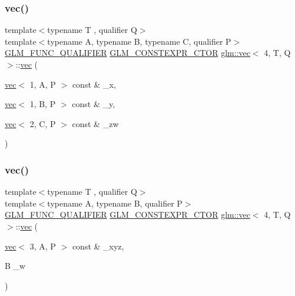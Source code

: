 \mbox{\label{structglm_1_1vec_3_014_00_01_t_00_01_q_01_4_ab16d5c7c6e22f08e197088a9535a114b}} 
\subsubsection{\texorpdfstring{vec()}{vec()}\hspace{0.1cm}{\footnotesize\ttfamily [28/34]}}
{\footnotesize\ttfamily template$<$typename T , qualifier Q$>$ \\
template$<$typename A, typename B, typename C, qualifier P$>$ \\
\mbox{\hyperlink{setup_8hpp_a33fdea6f91c5f834105f7415e2a64407}{G\+L\+M\+\_\+\+F\+U\+N\+C\+\_\+\+Q\+U\+A\+L\+I\+F\+I\+ER}} \mbox{\hyperlink{setup_8hpp_ad34178a09666081abdb573c14d1f4a5a}{G\+L\+M\+\_\+\+C\+O\+N\+S\+T\+E\+X\+P\+R\+\_\+\+C\+T\+OR}} \mbox{\hyperlink{structglm_1_1vec}{glm\+::vec}}$<$ 4, T, Q $>$\+::\mbox{\hyperlink{structglm_1_1vec}{vec}} (\begin{DoxyParamCaption}\item[{\mbox{\hyperlink{structglm_1_1vec}{vec}}$<$ 1, A, P $>$ const \&}]{\+\_\+x,  }\item[{\mbox{\hyperlink{structglm_1_1vec}{vec}}$<$ 1, B, P $>$ const \&}]{\+\_\+y,  }\item[{\mbox{\hyperlink{structglm_1_1vec}{vec}}$<$ 2, C, P $>$ const \&}]{\+\_\+zw }\end{DoxyParamCaption})}

\mbox{\label{structglm_1_1vec_3_014_00_01_t_00_01_q_01_4_adf93c96aee6aa7910fb218b3d0cb8697}} 
\subsubsection{\texorpdfstring{vec()}{vec()}\hspace{0.1cm}{\footnotesize\ttfamily [29/34]}}
{\footnotesize\ttfamily template$<$typename T , qualifier Q$>$ \\
template$<$typename A, typename B, qualifier P$>$ \\
\mbox{\hyperlink{setup_8hpp_a33fdea6f91c5f834105f7415e2a64407}{G\+L\+M\+\_\+\+F\+U\+N\+C\+\_\+\+Q\+U\+A\+L\+I\+F\+I\+ER}} \mbox{\hyperlink{setup_8hpp_ad34178a09666081abdb573c14d1f4a5a}{G\+L\+M\+\_\+\+C\+O\+N\+S\+T\+E\+X\+P\+R\+\_\+\+C\+T\+OR}} \mbox{\hyperlink{structglm_1_1vec}{glm\+::vec}}$<$ 4, T, Q $>$\+::\mbox{\hyperlink{structglm_1_1vec}{vec}} (\begin{DoxyParamCaption}\item[{\mbox{\hyperlink{structglm_1_1vec}{vec}}$<$ 3, A, P $>$ const \&}]{\+\_\+xyz,  }\item[{B}]{\+\_\+w }\end{DoxyParamCaption})}

